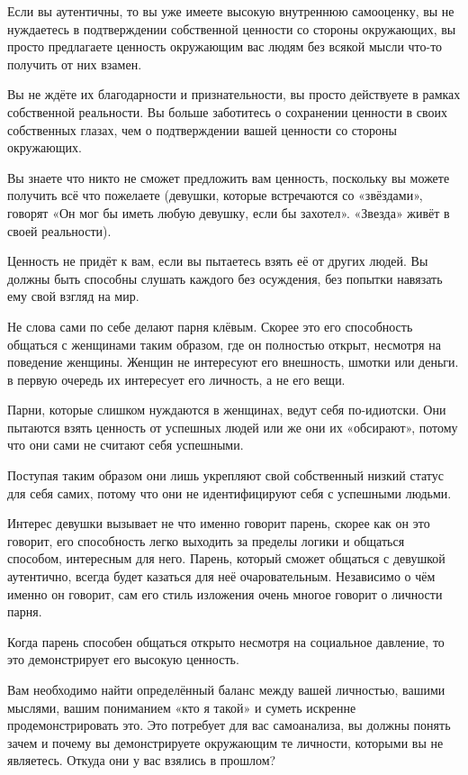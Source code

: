 Если вы аутентичны, то вы уже имеете высокую внутреннюю самооценку, вы не нуждаетесь в подтверждении собственной ценности со стороны окружающих, вы просто предлагаете ценность окружающим вас людям без всякой мысли что-то получить от них взамен.

Вы не ждёте их благодарности и признательности, вы просто действуете в рамках собственной реальности. Вы больше заботитесь о сохранении ценности в своих собственных глазах, чем о подтверждении вашей ценности со стороны окружающих.

Вы знаете что никто не сможет предложить вам ценность, поскольку вы можете получить всё что пожелаете (девушки, которые встречаются со «звёздами», говорят «Он мог бы иметь любую девушку, если бы захотел». «Звезда» живёт в своей реальности).

Ценность не придёт к вам, если вы пытаетесь взять её от других людей. Вы должны быть способны слушать каждого без осуждения, без попытки навязать ему свой взгляд на мир.

Не слова сами по себе делают парня клёвым. Скорее это его способность общаться с женщинами таким образом, где он полностью открыт, несмотря на поведение женщины. Женщин не интересуют его внешность, шмотки или деньги. в первую очередь их интересует его личность, а не его вещи.

Парни, которые слишком нуждаются в женщинах, ведут себя по-идиотски. Они пытаются взять ценность от успешных людей или же они их «обсирают», потому что они сами не считают себя успешными.

Поступая таким образом они лишь укрепляют свой собственный низкий статус для себя самих, потому что они не идентифицируют себя с успешными людьми.

Интерес девушки вызывает не что именно говорит парень, скорее как он это говорит, его способность легко выходить за пределы логики и общаться способом, интересным для него. Парень, который сможет общаться с девушкой аутентично, всегда будет казаться для неё очаровательным. Независимо о чём именно он говорит, сам его стиль изложения очень многое говорит о личности парня.

Когда парень способен общаться открыто несмотря на социальное давление, то это демонстрирует его высокую ценность.

Вам необходимо найти определённый баланс между вашей личностью, вашими мыслями, вашим пониманием «кто я такой» и суметь искренне продемонстрировать это. Это потребует для вас самоанализа, вы должны понять зачем и почему вы демонстрируете окружающим те личности, которыми вы не являетесь. Откуда они у вас взялись в прошлом?

